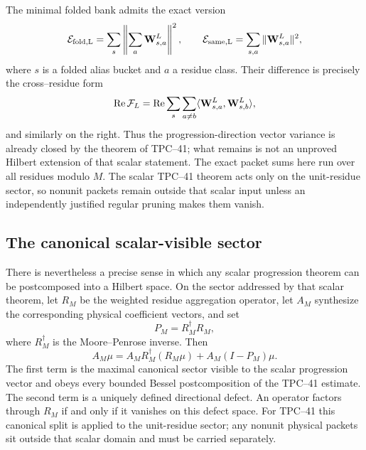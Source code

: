 The minimal folded bank admits the exact version
\begin{equation}
 \mathcal E_{\rm fold,L}
 =\sum_s\left\|\sum_a\mathbf W^L_{s,a}\right\|^2,
 \qquad
 \mathcal E_{\rm same,L}
 =\sum_{s,a}\|\mathbf W^L_{s,a}\|^2,
 \label{eq:tpc42-intro-packed-energies}
\end{equation}
where \(s\) is a folded alias bucket and \(a\) a residue class.  Their
difference is precisely the cross--residue form
\begin{equation}
 \operatorname{Re}\mathcal F_L
 =\operatorname{Re}
  \sum_s\sum_{a\ne b}
  \langle\mathbf W^L_{s,a},\mathbf W^L_{s,b}\rangle,
 \label{eq:tpc42-intro-cross-residue}
\end{equation}
and similarly on the right.  Thus the progression-direction vector
variance is already closed by the theorem of TPC--41; what remains is
not an unproved Hilbert extension of that scalar statement.
The exact packet sums here run over all residues modulo \(M\).  The
scalar TPC--41 theorem acts only on the unit-residue sector, so nonunit
packets remain outside that scalar input unless an independently justified
regular pruning makes them vanish.

\subsection{The canonical scalar-visible sector}

There is nevertheless a precise sense in which any scalar progression
theorem can be postcomposed into a Hilbert space.  On the sector addressed
by that scalar theorem, let \(R_M\) be the weighted residue aggregation
operator, let \(A_M\) synthesize the corresponding physical coefficient
vectors, and set
\begin{equation}
 P_M=R_M^\dagger R_M,
 \label{eq:tpc42-intro-P}
\end{equation}
where \(R_M^\dagger\) is the Moore--Penrose inverse.  Then
\begin{equation}
 \boxed{
 A_M\mu
 =A_MR_M^\dagger(R_M\mu)
  +A_M(I-P_M)\mu.}
 \label{eq:tpc42-intro-canonical-split}
\end{equation}
The first term is the maximal canonical sector visible to the scalar
progression vector and obeys every bounded Bessel postcomposition of the
TPC--41 estimate.  The second term is a uniquely defined directional
defect.  An operator factors through \(R_M\) if and only if it vanishes
on this defect space.
For TPC--41 this canonical split is applied to the unit-residue sector;
any nonunit physical packets sit outside that scalar domain and must be
carried separately.

